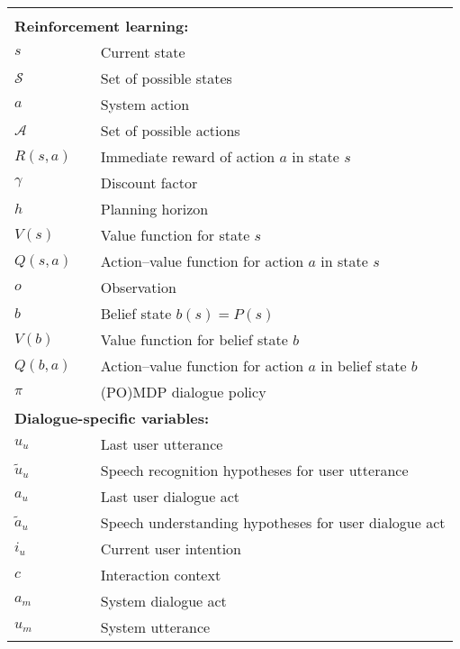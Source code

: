\begin{longtable}{lp{5mm}p{95mm}}
&&  \vspace{0mm} \\
\multicolumn{3}{l}{\textbf{Reinforcement learning:}} \vspace{2mm} \\
$s$ && Current state \\
$\mathcal{S}$ && Set of possible states \\
$a$ && System action \\ 
$\mathcal{A}$ && Set of possible actions \\
$R(s,a)$ && Immediate reward of action $a$ in state $s$ \\
$\gamma$ && Discount factor \\
$h$ && Planning horizon \\
$V(s)$ && Value function for state $s$ \\
$Q(s,a)$ && Action--value function for action $a$ in state $s$  \\
$o$ && Observation \\
$b$ && Belief state $b(s) = P(s)$ \\
$V(b)$ && Value function for belief state $b$  \\
$Q(b,a)$ && Action--value function for action $a$ in belief state $b$ \\
$\pi$ && (PO)MDP dialogue policy \\

\multicolumn{3}{l}{\textbf{Dialogue-specific variables:}} \vspace{2mm} \\

$u_u$ && Last user utterance \\
$\tilde{u}_u$ && Speech recognition hypotheses for user utterance \\
$a_u$ && Last user dialogue act \\
$\tilde{a}_u$ && Speech understanding hypotheses for user dialogue act \\
$i_u$ && Current user intention \\
$c$ && Interaction context \\
$a_m$ && System dialogue act \\
$u_m$ && System utterance \\


\end{longtable}
